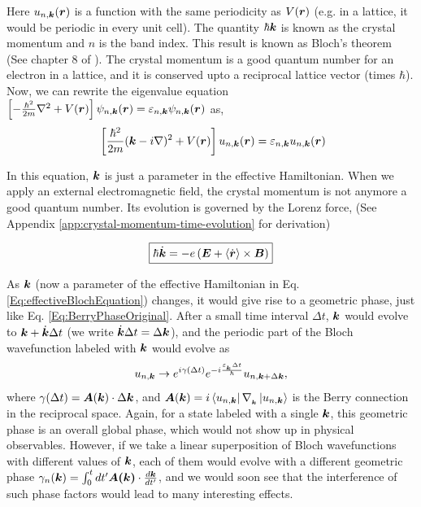 \documentclass{report}
\renewcommand\vec[1]{\ensuremath\boldsymbol{#1}} %
\begin{document}
Here $u_{n,\vec{k}} (\vec{r})$ is a function with the same periodicity as $V(\vec{r})$ (e.g. in a lattice, it would be periodic in every unit cell). The quantity $\hbar \vec{k}$ is known as the crystal momentum and $n$ is the band index. This result is known as Bloch's theorem (See chapter 8 of \cite{book:AshcroftMermin76}). The crystal momentum is a good quantum number for an electron in a lattice, and it is conserved upto a reciprocal lattice vector (times $\hbar$).
Now, we can rewrite the eigenvalue equation $\left[-\frac{\hbar^2}{2m}\nabla^2 + V(\vec{r}) \right] \psi_{n, \vec{k}}(\vec{r}) = \varepsilon_{n,\vec{k}} \psi_{n, \vec{k}}(\vec{r})$ as,
\begin{equation}~\label{Eq:effectiveBlochEquation}
	\left[\frac{\hbar^2}{2m}(\vec{k} - i \nabla)^2 + V(\vec{r}) \right]u_{n,\vec{k}} (\vec{r}) = \varepsilon_{n,\vec{k}} u_{n,\vec{k}} (\vec{r})
\end{equation}

In this equation, $\vec{k}$ is just a parameter in the effective Hamiltonian. When we apply an external electromagnetic field, the crystal momentum is not anymore a good quantum number. Its evolution is governed by the Lorenz force, (See Appendix \ref{app:crystal-momentum-time-evolution} for derivation)

\begin{equation} \label{Eq:evolution-of-k}
	\boxed{\hbar \dot{\vec{k}} = -e\left(\vec{E} + \langle\dot{\vec{r}}\rangle \times \vec{B} \right)}
\end{equation}

As $\vec{k}$ (now a parameter of the effective Hamiltonian in Eq. \ref{Eq:effectiveBlochEquation}) changes, it would give rise to a geometric phase, just like Eq. \ref{Eq:BerryPhaseOriginal}. After a small time interval $\Delta t$, $\vec{k}$ would evolve to $\vec{k} + \dot{\vec{k}} \Delta t$ (we write $\dot{\vec{k}} \Delta t = \Delta \vec{k} $), and the periodic part of the Bloch wavefunction labeled with $\vec{k}$ would evolve as 
\begin{equation}\label{Eq:u-n-k-time-evolution}
	u_{n, \vec{k}} \rightarrow e^{i \gamma(\Delta t)} e^{-i \frac{\varepsilon_{_{\vec{k}}} \Delta t}{\hbar}} u_{n, \vec{k}+\Delta \vec{k}},
\end{equation} where $\gamma(\Delta t) =\vec{A}(\vec{k}) \cdot \Delta \vec{k}$, and $ \vec{A}(\vec{k})=i \bra{u_{n,\vec{k}}}\nabla_{_{\vec{k}}} \ket{u_{n,\vec{k}}}$ is the Berry connection in the reciprocal space. Again, for a state labeled with a single $\vec{k}$, this geometric phase is an overall global phase, which would not show up in physical observables. However, if we take a linear superposition of Bloch wavefunctions with different values of $\vec{k}$, each of them would evolve with a different geometric phase $\gamma_n (\vec{k}) = \int_{0}^{t} dt' \vec{A(\vec{k})} \cdot \frac{d \vec{k}}{dt'} $, and we would soon see that the interference of such phase factors would lead to many interesting effects.
\end{document}
